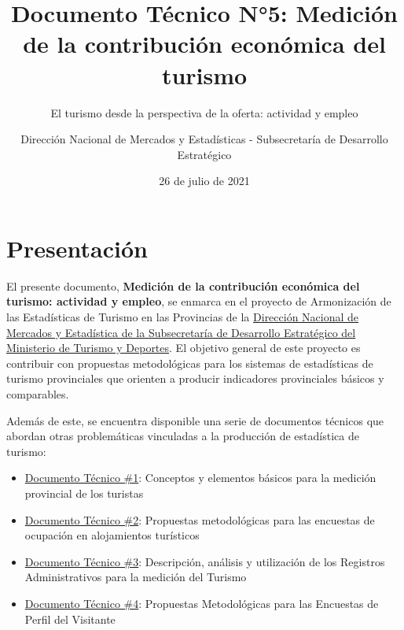 \documentclass[
  openany]{book}
\title{Documento Técnico N°5: Medición de la contribución económica del turismo}
\subtitle{El turismo desde la perspectiva de la oferta: actividad y empleo}
\author{Dirección Nacional de Mercados y Estadísticas - Subsecretaría de Desarrollo Estratégico}
\date{26 de julio de 2021}
\let\oldmaketitle\maketitle
\begin{document}
\maketitle


\newpage

\let\maketitle\oldmaketitle
\maketitle

{
\setcounter{tocdepth}{1}
\tableofcontents
}
\hypertarget{presentaciuxf3n}{%
\chapter*{Presentación}\label{presentaciuxf3n}}

El presente documento, \textbf{Medición de la contribución económica del turismo: actividad y empleo}, se enmarca en el proyecto de Armonización de las Estadísticas de Turismo en las Provincias de la \href{http://datos.yvera.gob.ar/}{Dirección Nacional de Mercados y Estadística de la Subsecretaría de Desarrollo Estratégico del Ministerio de Turismo y Deportes}. El objetivo general de este proyecto es contribuir con propuestas metodológicas para los sistemas de estadísticas de turismo provinciales que orienten a producir indicadores provinciales básicos y comparables.

Además de este, se encuentra disponible una serie de documentos técnicos que abordan otras problemáticas vinculadas a la producción de estadística de turismo:

\begin{itemize}
\item
  \href{https://dnme-minturdep.github.io/DT1_medicion_turismo/}{Documento Técnico \#1}: Conceptos y elementos básicos para la medición provincial de los turistas
\item
  \href{https://dnme-minturdep.github.io/DT2_encuestas/}{Documento Técnico \#2}: Propuestas metodológicas para las encuestas de ocupación en alojamientos turísticos
\item
  \href{https://dnme-minturdep.github.io/DT3_registros_adminsitrativos/}{Documento Técnico \#3}: Descripción, análisis y utilización de los Registros Administrativos para la medición del Turismo
\item
  \href{https://dnme-minturdep.github.io/DT4_perfiles/}{Documento Técnico \#4}: Propuestas Metodológicas para las Encuestas de Perfil del Visitante
\end{itemize}
\end{document}

